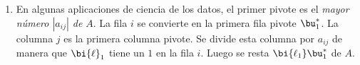 \begin{enumerate}
\noindent
Explique la respuesta: $A_k$ se factoriza como  \_\_\_\_  ya que $LU=\left[
\begin{array}{ll}
L_k & 0	\\
\ast & \ast
\end{array}
\right]\left[
\begin{array}{ll}
U_k & \ast	\\
0 & \ast
\end{array}
\right]$.




\item En algunas aplicaciones de ciencia de los datos, el primer pivote es el \emph{mayor n\'umero $|a_{ij}|$ de} $A$. %
La fila $i$ se convierte en la primera fila pivote $\bu_1^*$. La columna $j$ es la primera columna pivote. Se divide esta columna por $a_{ij}$ de manera que $\bi{\ell}_1$ tiene un $1$ en la fila $i$. Luego se resta
  $\bi{\ell_1}\bu_1^\ast$ de $A$. %


\end{enumerate}
